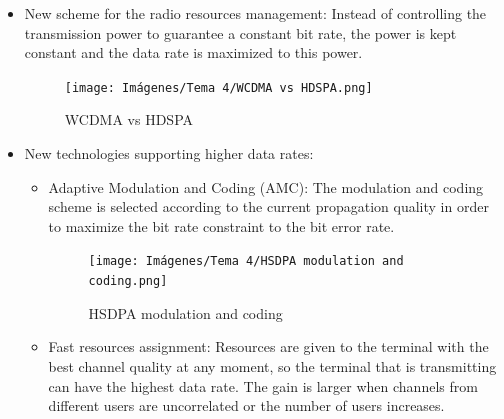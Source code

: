 \documentclass[
	12pt,
	twoside
]{book}
\begin{document}
\begin{itemize}
	\item {
		New scheme for the radio resources management: Instead of controlling the transmission power to guarantee a constant bit rate, the power is kept constant and the data rate is maximized to this power.

		\begin{figure}[H]
			\centering
			\texttt{[image: Imágenes/Tema 4/WCDMA vs HDSPA.png]}
			\caption{
				\label{fig:unit4_WCDMA_HDSPA}
				WCDMA vs HDSPA
			}
		\end{figure}
	}
	\item {
		New technologies supporting higher data rates:
		\begin{itemize}
			\item {
				Adaptive Modulation and Coding (AMC): The modulation and coding scheme is selected according to the current propagation quality in order to maximize the bit rate constraint to the bit error rate.

				\begin{figure}[H]
					\centering
					\texttt{[image: Imágenes/Tema 4/HSDPA modulation and coding.png]}
					\caption{
						\label{fig:unit4_HDSPA_mod_cod}
						HSDPA modulation and coding
					}
				\end{figure}
			}
			\item {
				Fast resources assignment: Resources are given to the terminal with the best channel quality at any moment, so the terminal that is transmitting can have the highest data rate. The gain is larger when channels from different users are uncorrelated or the number of users increases.

}
\end{itemize}}
\end{itemize}
\end{document}
